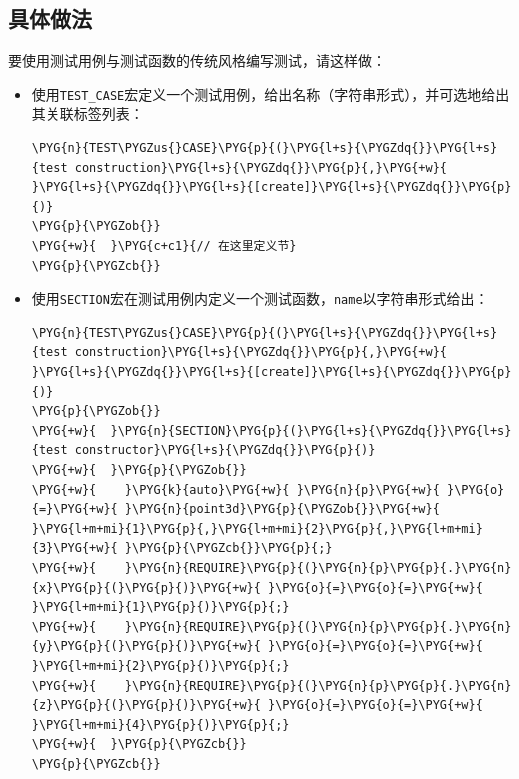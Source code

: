 
\subsection{具体做法}



要使用测试用例与测试函数的传统风格编写测试，请这样做：



\begin{itemize}
\item 使用\texttt{TEST\_\allowbreak{}CASE}宏定义一个测试用例，给出名称（字符串形式），并可选地给出其关联标签列表：



\begin{codeblockbg}
\begin{Verbatim}[commandchars=\\\{\},breaklines=true,breakanywhere=true,fontsize=\codefont,xleftmargin=17bp]
\PYG{n}{TEST\PYGZus{}CASE}\PYG{p}{(}\PYG{l+s}{\PYGZdq{}}\PYG{l+s}{test construction}\PYG{l+s}{\PYGZdq{}}\PYG{p}{,}\PYG{+w}{ }\PYG{l+s}{\PYGZdq{}}\PYG{l+s}{[create]}\PYG{l+s}{\PYGZdq{}}\PYG{p}{)}
\PYG{p}{\PYGZob{}}
\PYG{+w}{  }\PYG{c+c1}{// 在这里定义节}
\PYG{p}{\PYGZcb{}}
\end{Verbatim}
\end{codeblockbg}



\item 使用\texttt{SECTION}宏在测试用例内定义一个测试函数，\texttt{name}以字符串形式给出：



\begin{codeblockbg}
\begin{Verbatim}[commandchars=\\\{\},breaklines=true,breakanywhere=true,fontsize=\codefont,xleftmargin=17bp]
\PYG{n}{TEST\PYGZus{}CASE}\PYG{p}{(}\PYG{l+s}{\PYGZdq{}}\PYG{l+s}{test construction}\PYG{l+s}{\PYGZdq{}}\PYG{p}{,}\PYG{+w}{ }\PYG{l+s}{\PYGZdq{}}\PYG{l+s}{[create]}\PYG{l+s}{\PYGZdq{}}\PYG{p}{)}
\PYG{p}{\PYGZob{}}
\PYG{+w}{  }\PYG{n}{SECTION}\PYG{p}{(}\PYG{l+s}{\PYGZdq{}}\PYG{l+s}{test constructor}\PYG{l+s}{\PYGZdq{}}\PYG{p}{)}
\PYG{+w}{  }\PYG{p}{\PYGZob{}}
\PYG{+w}{    }\PYG{k}{auto}\PYG{+w}{ }\PYG{n}{p}\PYG{+w}{ }\PYG{o}{=}\PYG{+w}{ }\PYG{n}{point3d}\PYG{p}{\PYGZob{}}\PYG{+w}{ }\PYG{l+m+mi}{1}\PYG{p}{,}\PYG{l+m+mi}{2}\PYG{p}{,}\PYG{l+m+mi}{3}\PYG{+w}{ }\PYG{p}{\PYGZcb{}}\PYG{p}{;}
\PYG{+w}{    }\PYG{n}{REQUIRE}\PYG{p}{(}\PYG{n}{p}\PYG{p}{.}\PYG{n}{x}\PYG{p}{(}\PYG{p}{)}\PYG{+w}{ }\PYG{o}{=}\PYG{o}{=}\PYG{+w}{ }\PYG{l+m+mi}{1}\PYG{p}{)}\PYG{p}{;}
\PYG{+w}{    }\PYG{n}{REQUIRE}\PYG{p}{(}\PYG{n}{p}\PYG{p}{.}\PYG{n}{y}\PYG{p}{(}\PYG{p}{)}\PYG{+w}{ }\PYG{o}{=}\PYG{o}{=}\PYG{+w}{ }\PYG{l+m+mi}{2}\PYG{p}{)}\PYG{p}{;}
\PYG{+w}{    }\PYG{n}{REQUIRE}\PYG{p}{(}\PYG{n}{p}\PYG{p}{.}\PYG{n}{z}\PYG{p}{(}\PYG{p}{)}\PYG{+w}{ }\PYG{o}{=}\PYG{o}{=}\PYG{+w}{ }\PYG{l+m+mi}{4}\PYG{p}{)}\PYG{p}{;}
\PYG{+w}{  }\PYG{p}{\PYGZcb{}}
\PYG{p}{\PYGZcb{}}
\end{Verbatim}
\end{codeblockbg}



\end{itemize}
